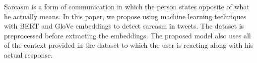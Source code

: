 Sarcasm is a form of communication in which the person states opposite of what he actually means. In this paper, we propose using machine learning techniques with BERT and GloVe embeddings to detect sarcasm in tweets. The dataset is preprocessed before extracting the embeddings. The proposed model also uses all of the context provided in the dataset to which the user is reacting along with his actual response.
